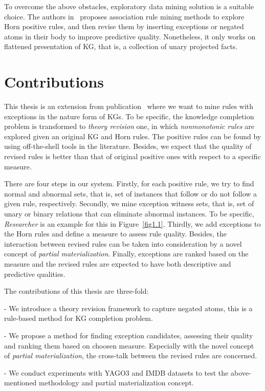To overcome the above obstacles, exploratory data mining solution is a suitable choice. The authors in~\cite{ref12} proposes association rule mining methods to explore Horn positive rules, and then revise them by inserting exceptions or negated atoms in their body to improve predictive quality. Nonetheless, it only works on flattened presentation of KG, that is, a collection of unary projected facts.

\section{Contributions}

This thesis is an extension from publication~\cite{ref12} where we want to mine rules with exceptions in the nature form of KGs. To be specific, the knowledge completion problem is transformed to \textit{theory revision} one, in which \textit{nonmonotonic rules} are explored given an original KG and Horn rules. The positive rules can be found by using off-the-shell tools in the literature. Besides, we expect that the quality of revised rules is better than that of original positive ones with respect to a specific measure.

There are four steps in our system. Firstly, for each positive rule, we try to find normal and abnormal sets, that is, set of instances that follow or do not follow a given rule, respectively. Secondly, we mine exception witness sets, that is, set of unary or binary relations that can eliminate abnormal instances. To be specific, \textit{Researcher} is an example for this in Figure~\ref{fig1.1}. Thirdly, we add exceptions to the Horn rules and define a measure to assess rule quality. Besides, the interaction between revised rules can be taken into consideration by a novel concept of \textit{partial materialization}. Finally, exceptions are ranked based on the measure and the revised rules are expected to have both descriptive and predictive qualities.

The contributions of this thesis are three-fold:

- We introduce a theory revision framework to capture negated atoms, this is a rule-based method for KG completion problem.

- We propose a method for finding exception candidates, assessing their quality and ranking them based on choosen measure. Especially with the novel concept of \textit{partial materialization}, the cross-talk between the revised rules are concerned.

- We conduct experiments with YAGO3 and IMDB datasets to test the above-mentioned methodology and partial materialization concept.

